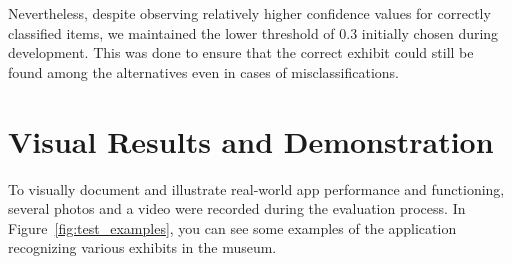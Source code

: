 Nevertheless, despite observing relatively higher confidence values for correctly classified items, we maintained the lower threshold of 0.3 initially chosen during development. This was done to ensure that the correct exhibit could still be found among the alternatives even in cases of misclassifications.

\section{Visual Results and Demonstration}

To visually document and illustrate real-world app performance and functioning, several photos and a video were recorded during the evaluation process. In Figure~\ref{fig:test_examples}, you can see some examples of the application recognizing various exhibits in the museum.

